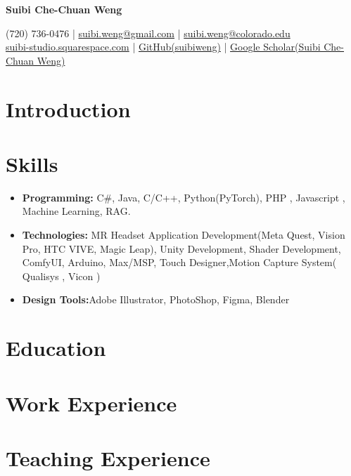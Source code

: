 \documentclass[a4paper,11pt]{article}
\begin{document}
\begin{center}

    {\Huge\textbf{\newline
  Suibi Che-Chuan Weng}}
\end{center}

\vspace{-4mm}
\begin{center}
    \small{
    (720) 736-0476 | \href{mailto:suibi.weng@gmail.com}{suibi.weng@gmail.com} | \href{mailto:Suibi.Weng@colorado.edu}{suibi.weng@colorado.edu}  \\
    \href{https://suibi-studio.squarespace.com}{suibi-studio.squarespace.com} | \href{https://github.com/suibiweng}{GitHub(suibiweng)} | \href{https://scholar.google.com/citations?user=Pg6L1W4AAAAJ&hl=en}{Google Scholar(Suibi Che-Chuan Weng)}
    }
\end{center}




\section*{Introduction}
 
\section*{Skills}
\begin{itemize}
    \item \textbf{Programming:} C\#, Java, C/C++, Python(PyTorch), PHP , Javascript , Machine Learning, RAG.
    \item \textbf{Technologies:} MR Headset Application Development(Meta Quest, Vision Pro, HTC VIVE, Magic Leap), Unity Development, Shader Development, ComfyUI, Arduino, Max/MSP, Touch Designer,Motion Capture System( Qualisys , Vicon )
    \item \textbf{Design Tools:}Adobe Illustrator, PhotoShop, Figma, Blender
\end{itemize}


\section*{Education}


\section*{Work Experience}


\section*{Teaching Experience}

\end{document}
